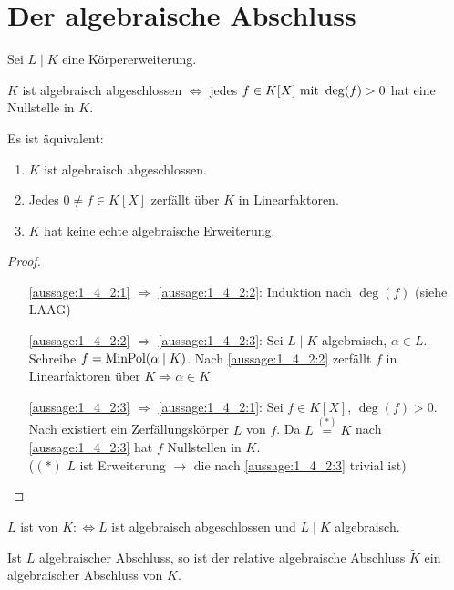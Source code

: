 \section{Der algebraische Abschluss}
Sei $L\mid K$ eine Körpererweiterung.
\begin{definition}
	$K$ ist algebraisch abgeschlossen $\Longleftrightarrow$ jedes $f \in K[X] \mit \deg(f) > 0$ hat eine Nullstelle in $K$.
\end{definition}
\begin{lemma}
	Es ist äquivalent:
	\begin{enumerate}[label=(\alph*)]
		\item $K$ ist algebraisch abgeschlossen. \label{aussage:1_4_2:1}
		\item Jedes $0 \neq f \in K[X]$ zerfällt über $K$ in Linearfaktoren. \label{aussage:1_4_2:2}
		\item $K$ hat keine echte algebraische Erweiterung. \label{aussage:1_4_2:3}
	\end{enumerate}
\end{lemma}
\begin{proof}\leavevmode %
	\vspace*{\dimexpr-\baselineskip+2\lineskip}
	\begin{itemize}[leftmargin=6em]
		\item[\ref{aussage:1_4_2:1} $\Rightarrow$ \ref{aussage:1_4_2:2}:] Induktion nach $\deg(f)$ (siehe LAAG)
		\item[\ref{aussage:1_4_2:2} $\Rightarrow$ \ref{aussage:1_4_2:3}:] Sei $L \mid K$ algebraisch, $\alpha \in L$. Schreibe $f = \MinPol(\alpha \mid K)$. Nach \ref{aussage:1_4_2:2} zerfällt $f$ in Linearfaktoren über $K \Rightarrow \alpha \in K$
		\item[\ref{aussage:1_4_2:3} $\Rightarrow$ \ref{aussage:1_4_2:1}:] Sei $f \in K[X]$, $\deg(f) > 0$. Nach  existiert ein Zerfällungskörper $L$ von $f$. Da $L\overset{(*)}{=}K$ nach \ref{aussage:1_4_2:3} hat $f$ Nullstellen in $K$. \\
		($(*)$ $L$ ist Erweiterung $\rightarrow$ die nach \ref{aussage:1_4_2:3} trivial ist)
	\end{itemize}
\end{proof}
\begin{definition}
	$L$ ist  von $K :\Longleftrightarrow L$ ist algebraisch abgeschlossen und $L\mid K$ algebraisch.
\end{definition}
\begin{lemma}
	Ist $L$ algebraischer Abschluss, so ist der relative algebraische Abschluss $\tilde{K}$ ein algebraischer Abschluss von $K$.
\end{lemma}
